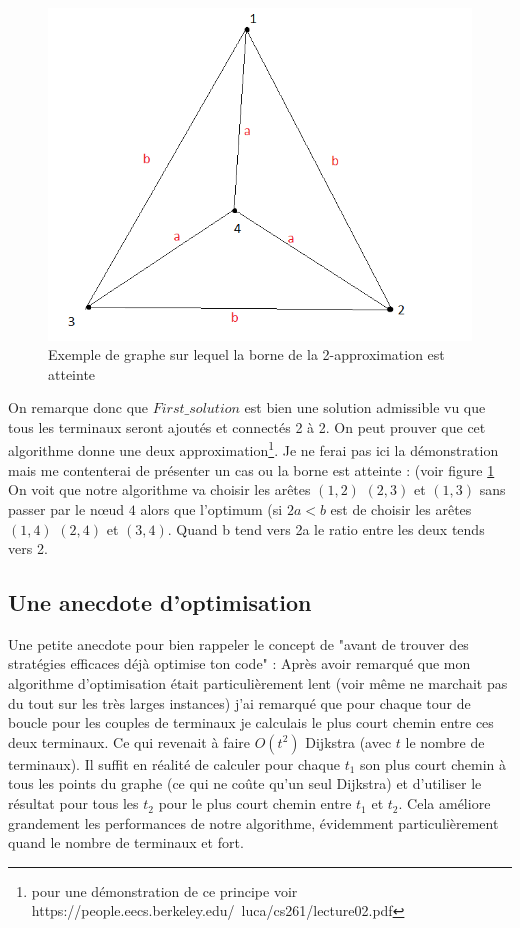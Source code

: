 \documentclass[10pt,a4paper]{article}
\begin{document}
\begin{figure}
\includegraphics[scale=.5]{images/exemple_borne}
\caption{Exemple de graphe sur lequel la borne de la 2-approximation est atteinte}
\label{exborne}
\end{figure}
 

On remarque donc que $First\_solution$ est bien une solution admissible vu que tous les terminaux seront ajoutés et connectés 2 à 2. On peut prouver que cet algorithme donne une deux approximation\footnote{pour une démonstration de ce principe voir https://people.eecs.berkeley.edu/~luca/cs261/lecture02.pdf}. Je ne ferai pas ici la démonstration mais me contenterai de présenter un cas ou la borne est atteinte : (voir figure \ref{exborne} On voit que notre algorithme va choisir les arêtes $(1,2)$ $(2,3)$ et $(1,3)$ sans passer par le nœud $4$ alors que l'optimum (si $2a<b$ est de choisir les arêtes $(1,4)$ $(2,4)$ et $(3,4)$. Quand b tend vers 2a le ratio entre les deux tends vers 2.



\subsection{Une anecdote d'optimisation}
Une petite anecdote pour bien rappeler le concept de "avant de trouver des stratégies efficaces déjà optimise ton code" :
Après avoir remarqué que mon algorithme d'optimisation était particulièrement lent (voir même ne marchait pas du tout sur les très larges instances) j'ai remarqué que pour chaque tour de boucle pour les couples de terminaux je calculais le plus court chemin entre ces deux terminaux. Ce qui revenait à faire $O(t^2)$ Dijkstra (avec $t$ le nombre de terminaux).  Il suffit en réalité de calculer pour chaque $t_1$ son plus court chemin à tous les points du graphe (ce qui ne coûte qu'un seul Dijkstra) et d'utiliser le résultat pour tous les $t_2$ pour le plus court chemin entre $t_1$ et $t_2$. Cela améliore grandement les performances de notre algorithme, évidemment particulièrement quand le nombre de terminaux et fort. 
\end{document}
